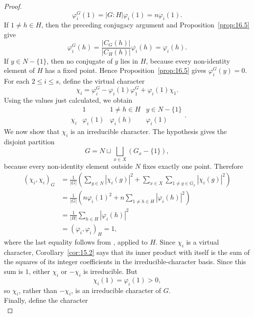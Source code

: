 \documentclass[../Odyssey_Project.tex]{subfiles}
\begin{document}
\begin{proof}
    \[
        \varphi_i^G(1)=|G : H|\varphi_i(1)=n\varphi_i(1).
    \]
    If $1\neq h\in H$, then the preceding conjugacy argument and Proposition~\ref{prop:16.5} give
    \[
        \varphi_i^G(h)
        =
        \frac{|C_G(h)|}{|C_H(h)|}\varphi_i(h)
        =
        \varphi_i(h).
    \]
    If $y\in N-\{1\}$, then no conjugate of $y$ lies in $H$, because every non-identity element of $H$ has a fixed point. Hence Proposition~\ref{prop:16.5} gives $\varphi_i^G(y)=0$.\\
    For each $2\leq i\leq s$, define the virtual character
    \[
        \chi_i
        =
        \varphi_i^G-\varphi_i(1)\varphi_1^G+\varphi_i(1)\chi_1.
    \]
    Using the values just calculated, we obtain
    \[
        \begin{array}{c|ccc}
            &1&1\neq h\in H&y\in N-\{1\}\\
            \hline
            \chi_i&\varphi_i(1)&\varphi_i(h)&\varphi_i(1)
        \end{array}.
    \]
    We now show that $\chi_i$ is an irreducible character. The hypothesis gives the disjoint partition
    \[
        G
        =
        N\sqcup\bigsqcup_{x\in X}(G_x-\{1\}),
    \]
    because every non-identity element outside $N$ fixes exactly one point. Therefore
    \begin{align*}
        (\chi_i,\chi_i)_G
        &=
        \frac{1}{|G|}
        \left(
            \sum_{g\in N}|\chi_i(g)|^2
            +
            \sum_{x\in X}\sum_{1\neq g\in G_x}|\chi_i(g)|^2
        \right) \\
        &=
        \frac{1}{|G|}
        \left(
            n\varphi_i(1)^2
            +
            n\sum_{1\neq h\in H}|\varphi_i(h)|^2
        \right) \\
        &=
        \frac{1}{|H|}
        \sum_{h\in H}|\varphi_i(h)|^2 \\
        &=
        (\varphi_i,\varphi_i)_H
        =
        1,
    \end{align*}
    where the last equality follows from , applied to $H$. Since $\chi_i$ is a virtual character, Corollary~\ref{cor:15.2} says that its inner product with itself is the sum of the squares of its integer coefficients in the irreducible-character basis. Since this sum is $1$, either $\chi_i$ or $-\chi_i$ is irreducible. But
    \[
        \chi_i(1)=\varphi_i(1)>0,
    \]
    so $\chi_i$, rather than $-\chi_i$, is an irreducible character of $G$.\\
    Finally, define the character
    \[
\]
\end{proof}
\end{document}
